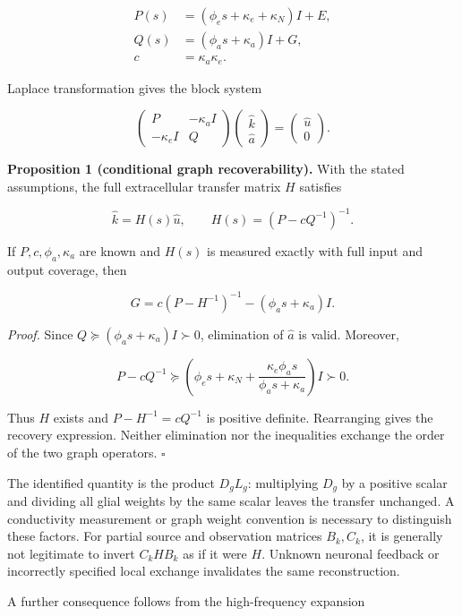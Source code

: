 \documentclass[
  11pt,
]{article}
\begin{document}
\[\begin{aligned}
P(s)&=(\phi_e s+\kappa_e+\kappa_N)I+E,\\
Q(s)&=(\phi_a s+\kappa_a)I+G,\\
c&=\kappa_a\kappa_e .
\end{aligned}\]

Laplace transformation gives the block system

\[\begin{pmatrix}P&-\kappa_a I\\-\kappa_e I&Q\end{pmatrix}\begin{pmatrix}\widehat k\\\widehat a\end{pmatrix}=\begin{pmatrix}\widehat u\\0\end{pmatrix}.\]

\textbf{Proposition 1 (conditional graph recoverability).} With the
stated assumptions, the full extracellular transfer matrix \(H\)
satisfies

\[\widehat k=H(s)\widehat u,\qquad H(s)=(P-cQ^{-1})^{-1}.\]

If \(P,c,\phi_a,\kappa_a\) are known and \(H(s)\) is measured exactly
with full input and output coverage, then

\[\boxed{G=c(P-H^{-1})^{-1}-(\phi_a s+\kappa_a)I.}\]

\emph{Proof.} Since \(Q\succeq(\phi_a s+\kappa_a)I\succ0\), elimination
of \(\widehat a\) is valid. Moreover,

\[P-cQ^{-1}\succeq\left(\phi_e s+\kappa_N+\frac{\kappa_e\phi_a s}{\phi_a s+\kappa_a}\right)I\succ0.\]

Thus \(H\) exists and \(P-H^{-1}=cQ^{-1}\) is positive definite.
Rearranging gives the recovery expression. Neither elimination nor the
inequalities exchange the order of the two graph operators. \(\square\)

The identified quantity is the product \(D_gL_g\): multiplying \(D_g\)
by a positive scalar and dividing all glial weights by the same scalar
leaves the transfer unchanged. A conductivity measurement or graph
weight convention is necessary to distinguish these factors. For partial
source and observation matrices \(B_k,C_k\), it is generally not
legitimate to invert \(C_kHB_k\) as if it were \(H\). Unknown neuronal
feedback or incorrectly specified local exchange invalidates the same
reconstruction.

A further consequence follows from the high-frequency expansion
\end{document}
